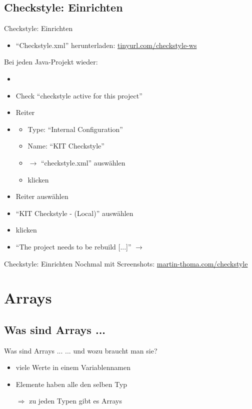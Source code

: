 \documentclass[usepdftitle=false,hyperref={pdfpagelabels=false}]{beamer}
\begin{document}
\subsection{Checkstyle: Einrichten}
\begin{frame}{Checkstyle: Einrichten}
    \begin{itemize}
        \item "`Checkstyle.xml"' herunterladen: \href{https://raw.github.com/MartinThoma/prog-ws1213/master/Dokumente/whitespace-checks.xml}{tinyurl.com/checkstyle-ws}
    \end{itemize}
    Bei jeden Java-Projekt wieder:
    \begin{itemize}
        \item {}
        \item Check "`checkstyle active for this project"'
        \item Reiter 
        \item {}
          \begin{itemize}
            \item Type: "`Internal Configuration"'
            \item Name: "`KIT Checkstyle"'
            \item {} $\rightarrow$ "`checkstyle.xml"' auswählen
            \item {} klicken
          \end{itemize}
        \item Reiter  auswählen
        \item "`KIT Checkstyle - (Local)"' auswählen
        \item {} klicken
        \item "`The project needs to be rebuild [...]"' $\rightarrow$ 
    \end{itemize}
\end{frame}

\begin{frame}{Checkstyle: Einrichten}
    Nochmal mit Screenshots: \href{http://martin-thoma.com/checkstyle/}{martin-thoma.com/checkstyle}
\end{frame}

\section{Arrays}
\subsection{Was sind Arrays ...}
\begin{frame}{Was sind Arrays ...}
    ... und wozu braucht man sie?
    \begin{itemize}
        \item viele Werte in einem Variablennamen
        \item Elemente haben alle den selben Typ
        \item[$\Rightarrow$] zu jeden Typen gibt es Arrays
    \end{itemize}
\end{frame}
\end{document}
